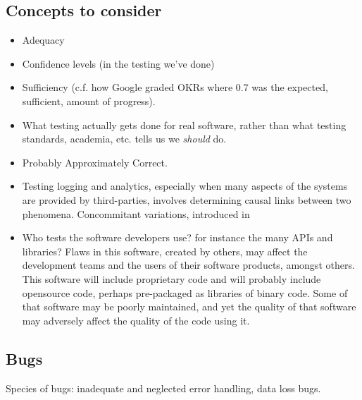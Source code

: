 \subsection{Concepts to consider}
\begin{itemize}
    \item Adequacy
    \item Confidence levels (in the testing we've done)
    \item Sufficiency (c.f. how Google graded OKRs where 0.7 was the expected, sufficient, amount of progress).
    \item What testing actually gets done for real software, rather than what testing standards, academia, etc. tells us we \emph{should} do.
    \item Probably Approximately Correct.
    \item Testing logging and analytics, especially when many aspects of the systems are provided by third-parties, involves determining causal links between two phenomena. Concommitant variations, introduced in~\cite{mill1884system}
    \item Who tests the software developers use? for instance the many APIs and libraries? Flaws in this software, created by others, may affect the development teams and the users of their software products, amongst others. This software will include proprietary code and will probably include opensource code, perhaps pre-packaged as libraries of binary code. Some of that software may be poorly maintained, and yet the quality of that software may adversely affect the quality of the code using it. 
\end{itemize}



\subsection{Bugs}
Species of bugs: inadequate and neglected error handling, data loss bugs.

